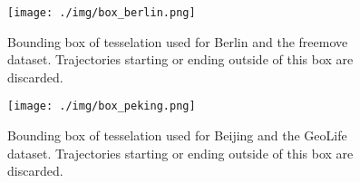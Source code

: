 \begin{figure}[H]
    \centering
    \texttt{[image: ./img/box\_berlin.png]}
    \caption{Bounding box of tesselation used for Berlin and the freemove dataset. Trajectories starting or ending outside of this box are discarded.}
    \label{Figure:boxberlin}
\end{figure}

\begin{figure}[H]
    \centering
    \texttt{[image: ./img/box\_peking.png]}
    \caption{Bounding box of tesselation used for Beijing and the GeoLife dataset. Trajectories starting or ending outside of this box are discarded.}
    \label{Figure:boxpeking}
\end{figure}




